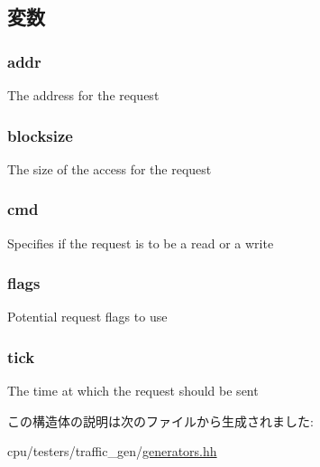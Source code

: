 \subsection{変数}
\hypertarget{structTraceGen_1_1TraceElement_a0bb77b4ba61e408313e1118250f9278c}{
\subsubsection[{addr}]{ {\bf addr}}}
\label{structTraceGen_1_1TraceElement_a0bb77b4ba61e408313e1118250f9278c}
The address for the request \hypertarget{structTraceGen_1_1TraceElement_ac1ad082ce835505ea433e658c844c8ac}{
\subsubsection[{blocksize}]{ {\bf blocksize}}}
\label{structTraceGen_1_1TraceElement_ac1ad082ce835505ea433e658c844c8ac}
The size of the access for the request \hypertarget{structTraceGen_1_1TraceElement_af88eb56d484b750933cd2ea86594f001}{
\subsubsection[{cmd}]{ {\bf cmd}}}
\label{structTraceGen_1_1TraceElement_af88eb56d484b750933cd2ea86594f001}
Specifies if the request is to be a read or a write \hypertarget{structTraceGen_1_1TraceElement_a539ce2286409a81e04ce978c1ea74c18}{
\subsubsection[{flags}]{ {\bf flags}}}
\label{structTraceGen_1_1TraceElement_a539ce2286409a81e04ce978c1ea74c18}
Potential request flags to use \hypertarget{structTraceGen_1_1TraceElement_a4daae57fbf09ee5423d123f5ce330e92}{
\subsubsection[{tick}]{ {\bf tick}}}
\label{structTraceGen_1_1TraceElement_a4daae57fbf09ee5423d123f5ce330e92}
The time at which the request should be sent 

この構造体の説明は次のファイルから生成されました:\begin{DoxyCompactItemize}
\item 
cpu/testers/traffic\_\-gen/\hyperlink{generators_8hh}{generators.hh}\end{DoxyCompactItemize}
